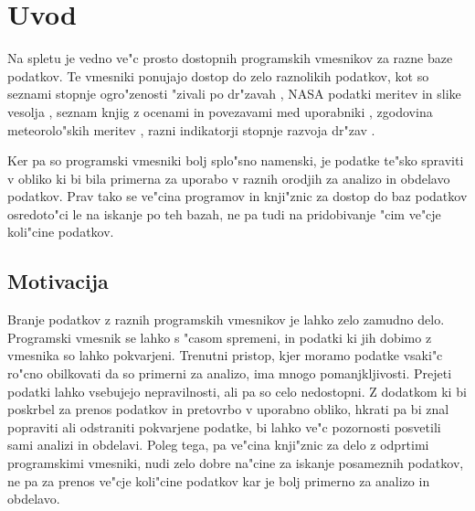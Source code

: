 \chapter{Uvod}

Na spletu je vedno ve"c prosto dostopnih programskih vmesnikov za razne
baze podatkov. Te vmesniki ponujajo dostop do zelo raznolikih podatkov, kot so 
seznami stopnje ogro"zenosti "zivali po dr"zavah 
, 
NASA podatki meritev in slike vesolja 
, 
seznam knjig z ocenami in povezavami med uporabniki 
,
zgodovina meteorolo"skih meritev
, 
razni indikatorji stopnje razvoja dr"zav
.

Ker pa so programski vmesniki bolj splo"sno namenski, je
podatke te"sko spraviti v obliko ki bi bila primerna za uporabo v raznih 
orodjih za analizo in obdelavo podatkov. Prav tako se ve"cina programov in knji"znic za dostop
do baz podatkov osredoto"ci le na iskanje po teh bazah, ne pa tudi na
pridobivanje "cim ve"cje koli"cine podatkov.






\section{Motivacija}

Branje podatkov z raznih programskih vmesnikov je lahko zelo zamudno delo.
Programski vmesnik se lahko s "casom spremeni, in podatki ki jih dobimo z
vmesnika so lahko pokvarjeni. Trenutni pristop, kjer moramo podatke vsaki"c ro"cno
obilkovati da so primerni za analizo, ima mnogo pomanjkljivosti. Prejeti podatki
lahko vsebujejo nepravilnosti, ali pa so celo nedostopni. Z dodatkom ki bi
poskrbel za prenos podatkov in pretovrbo v uporabno obliko, hkrati pa bi znal
popraviti ali odstraniti pokvarjene podatke, bi lahko ve"c pozornosti posvetili
sami analizi in obdelavi. Poleg tega, pa ve"cina knji"znic za delo z odprtimi
programskimi vmesniki, nudi zelo dobre na"cine za iskanje posameznih podatkov,
ne pa za prenos ve"cje koli"cine podatkov kar je bolj primerno za analizo in
obdelavo.



